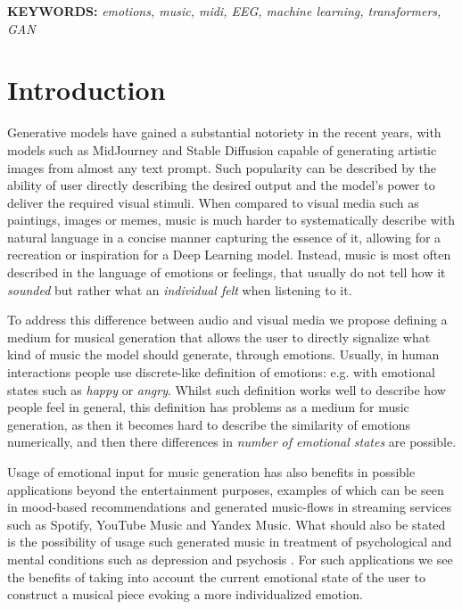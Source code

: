 \documentclass[14pt]{extreport}
\begin{document}
\textbf{KEYWORDS: } \emph{emotions, music, midi, EEG, machine learning, transformers, GAN}

\setlength{\parindent}{1cm}

\section{Introduction}
Generative models have gained a substantial notoriety in the recent years, with models such as MidJourney\cite{midj} and Stable Diffusion\cite{stable} capable of generating artistic images from almost any text prompt. Such popularity can be described by the ability of user directly describing the desired output and the model's power to deliver the required visual stimuli. When compared to visual media such as paintings, images or memes, music is much harder to systematically describe with natural language in a concise manner capturing the essence of it, allowing for a recreation or inspiration for a Deep Learning model. Instead, music is most often described in the language of emotions or feelings, that usually do not tell how it \textit{sounded} but rather what an \textit{individual felt} when listening to it.  

To address this difference between audio and visual media we propose defining a medium for musical generation that allows the user to directly signalize what kind of music the model should generate, through emotions. Usually, in human interactions people use discrete-like definition of emotions: e.g. with emotional states such as \textit{happy} or \textit{angry}. Whilst such definition works well to describe how people feel in general, this definition has problems as a medium for music generation, as then it becomes hard to describe the similarity of emotions numerically, and then there differences in \textit{number of emotional states} are possible. 

Usage of emotional input for music generation has also benefits in possible applications beyond the entertainment purposes, examples of which can be seen in mood-based recommendations and generated music-flows in streaming services such as Spotify, YouTube Music and Yandex Music. What should also be stated is the possibility of usage such generated music in treatment of psychological and mental conditions such as depression and psychosis \cite{depression}. For such applications we see the benefits of taking into account the current emotional state of the user to construct a musical piece evoking a more individualized emotion.
\end{document}
